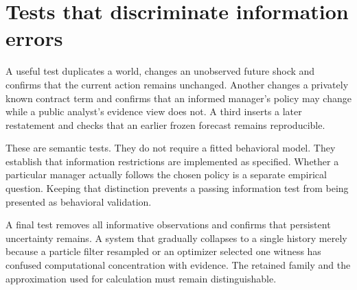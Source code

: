 \section{Tests that discriminate information errors}
A useful test duplicates a world, changes an unobserved future shock and confirms that the current action remains unchanged. Another changes a privately known contract term and confirms that an informed manager's policy may change while a public analyst's evidence view does not. A third inserts a later restatement and checks that an earlier frozen forecast remains reproducible.

These are semantic tests. They do not require a fitted behavioral model. They establish that information restrictions are implemented as specified. Whether a particular manager actually follows the chosen policy is a separate empirical question. Keeping that distinction prevents a passing information test from being presented as behavioral validation.

A final test removes all informative observations and confirms that persistent uncertainty remains. A system that gradually collapses to a single history merely because a particle filter resampled or an optimizer selected one witness has confused computational concentration with evidence. The retained family and the approximation used for calculation must remain distinguishable.
